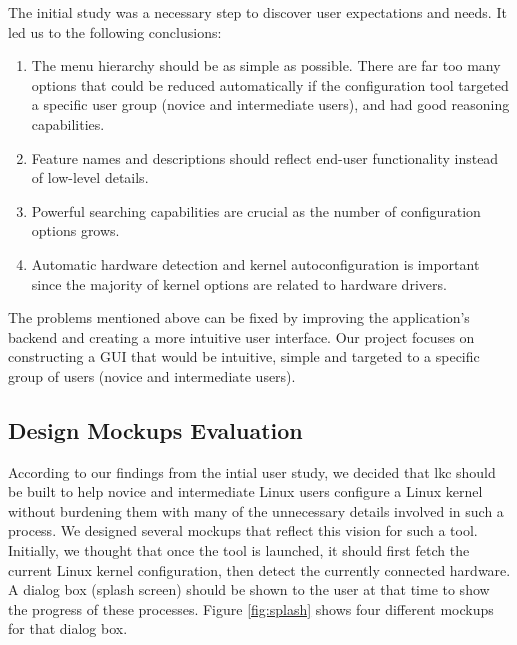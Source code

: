 \documentclass{chi2009}
\begin{document}

The initial study was a necessary step to discover user expectations and needs. It led us to the following conclusions:
\begin{enumerate}
\item The menu hierarchy should be as simple as possible. There are far too many options that could be reduced automatically if the configuration tool targeted
a specific user group (novice and intermediate users), and had good reasoning capabilities.
\item Feature names and descriptions should reflect end-user functionality instead of low-level details.
\item Powerful searching capabilities are crucial as the number of configuration options grows.
\item Automatic hardware detection and kernel autoconfiguration is important since the majority of kernel options are related to hardware drivers.
\end{enumerate}

The problems mentioned above can be fixed by improving the application's backend and creating a more intuitive user interface. Our project focuses on
constructing a GUI that would be intuitive, simple and targeted to a specific group of users (novice and intermediate users).

\subsection{Design Mockups Evaluation}
According to our findings from the intial user study, we decided that \textsf{lkc} should be built to help novice and intermediate Linux users configure a Linux
kernel without burdening them with many of the unnecessary details involved in such a process. We designed several mockups that reflect this vision for such a
tool. Initially, we thought that once the tool is launched, it should first fetch the current Linux kernel configuration, then detect the currently connected
hardware. A dialog box (splash screen) should be shown to the user at that time to show the progress of these processes. Figure \ref{fig:splash} shows four
different mockups for that dialog box.
\end{document}
